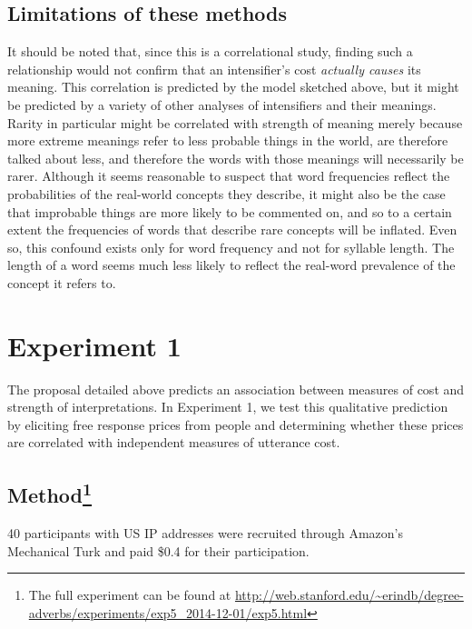 \documentclass[10pt,letterpaper]{article}
\begin{document}
\subsection{Limitations of these methods}
It should be noted that, since this is a correlational study, finding such a relationship would not confirm that an intensifier's cost \emph{actually causes} its meaning. This correlation is predicted by the model sketched above, but it might be predicted by a variety of other analyses of intensifiers and their meanings. Rarity in particular might be correlated with strength of meaning merely because more extreme meanings refer to less probable things in the world, are therefore talked about less, and therefore the words with those meanings will necessarily be rarer. Although it seems reasonable to suspect that word frequencies reflect the probabilities of the real-world concepts they describe, it might also be the case that improbable things are more likely to be commented on, and so to a certain extent the frequencies of words that describe rare concepts will be inflated. Even so, this confound exists only for word frequency and not for syllable length.
The length of a word seems much less likely to reflect the real-word prevalence of the concept it refers to.

\section{Experiment 1}

The proposal detailed above predicts an association between measures of cost and strength of interpretations. In Experiment 1, we test this qualitative prediction %
by eliciting free response prices from people and determining whether these prices are correlated with independent measures of utterance cost.

\subsection{Method\footnote{The full experiment can be found at \url{http://web.stanford.edu/~erindb/degree-adverbs/experiments/exp5_2014-12-01/exp5.html}}}

40 participants with US IP addresses were recruited through Amazon's Mechanical Turk and paid \$0.4 for their participation.
\end{document}
